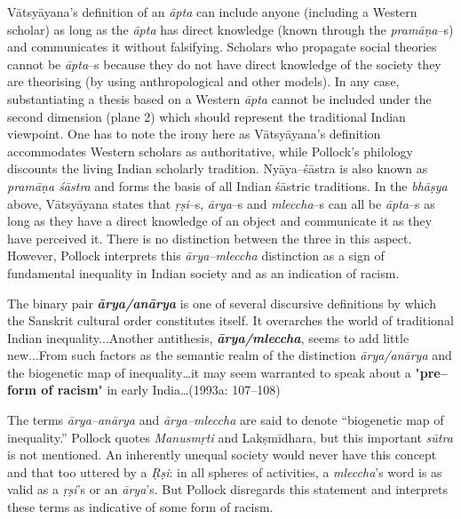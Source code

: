 Vātsyāyana’s definition of an \textit{āpta} can include anyone (including a Western scholar) as long as the \textit{āpta }has direct knowledge (known through the \textit{pramāṇa}–s) and communicates it without falsifying. Scholars who propagate social theories cannot be \textit{āpta}–s because they do not have direct knowledge of the society they are theorising (by using anthropological and other models). In any case, substantiating a thesis based on a Western \textit{āpta} cannot be included under the second dimension (plane 2) which should represent the traditional Indian viewpoint. One has to note the irony here as Vātsyāyana’s definition accommodates Western scholars as authoritative, while Pollock’s philology discounts the living Indian scholarly tradition. Nyāya–śāstra is also known as \textit{pramāṇa śāstra }and forms the basis of all Indian śāstric traditions. In the \textit{bhāṣya} above, Vātsyāyana states that \textit{ṛṣi}–s, \textit{ārya}–s and \textit{mleccha}–s can all be \textit{āpta}–s as long as they have a direct knowledge of an object and communicate it as they have perceived it. There is no distinction between the three in this aspect. However, Pollock interprets this \textit{ārya–mleccha }distinction as a sign of fundamental inequality in Indian society and as an indication of racism.

\begin{myquote}
The binary pair \textit{\textbf{ārya/anārya}} is one of several discursive definitions by which the Sanskrit cultural order constitutes itself. It overarches the world of traditional Indian inequality...Another antithesis, \textit{\textbf{ā}\textbf{rya/mleccha}}, seems to add little new...From such factors as the semantic realm of the distinction \textit{ārya/anārya} and the biogenetic map of inequality…it may seem warranted to speak about a "\textbf{pre–form of racism}" in early India…\break (1993a: 107–108)
\end{myquote}

The terms \textit{ārya–anārya} and \textit{ārya–mleccha} are said to denote “biogenetic map of inequality.” Pollock quotes \textit{Manusmṛti} and Lakṣmīdhara, but this important \textit{sūtra }is not mentioned. An inherently unequal society would never have this concept and that too uttered by a \textit{Ṛṣi}: in all spheres of activities, a \textit{mleccha}’s word is as valid as a \textit{ṛṣi}’s or an\textit{ ārya}’s. But Pollock disregards this statement and interprets these terms as indicative of some form of racism.

